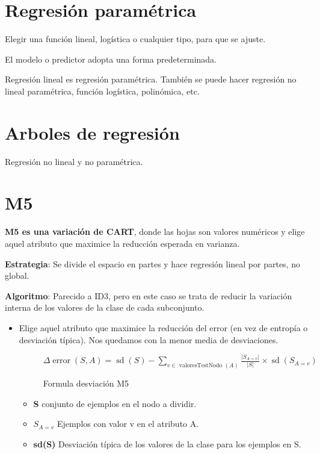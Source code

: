 \documentclass[12pt]{report} %
\begin{document}
\section{Regresión paramétrica}

Elegir una función lineal, logística o cualquier tipo, para que se
ajuste.

El modelo o predictor adopta una forma predeterminada.

Regresión lineal es regresión paramétrica. También se puede hacer
regresión no lineal paramétrica, función logística, polinómica, etc.

\section{Arboles de regresión}

Regresión no lineal y no paramétrica.

\section{M5}

\textbf{M5 es una variación de CART}, donde las hojas son valores numéricos y
elige aquel atributo que maximice la reducción esperada en varianza.

\textbf{Estrategia}: Se divide el espacio en partes y hace regresión
lineal por partes, no global.

\textbf{Algoritmo}: Parecido a ID3, pero en este caso se trata de
reducir la variación interna de los valores de la clase de cada
subconjunto.

\begin{itemize}
\item
  Elige aquel atributo que maximice la reducción del error (en vez de
  entropía o desviación típica). Nos quedamos con la menor media de
  desviaciones.
  \begin{figure}[H]
    \(\Delta \operatorname{error}(S, A)=\operatorname{sd}(S)-\sum_{v \in \text { valoresTestNodo }(A)} \frac{\left|S_{A=v}\right|}{|S|} \times \operatorname{sd}\left(S_{A=v}\right)\)
    \captionsetup{justification=centering}
    \caption{Formula desviación M5}
  \end{figure}

  \begin{itemize}
  
  \item
    \textbf{S} conjunto de ejemplos en el nodo a dividir.
  \item
    \textbf{\(S_{A=v}\)} Ejemplos con valor v en el atributo A.
  \item
    \textbf{sd(S)} Desviación típica de los valores de la clase para los
    ejemplos en S.
  \end{itemize}
\end{itemize}
\end{document}
